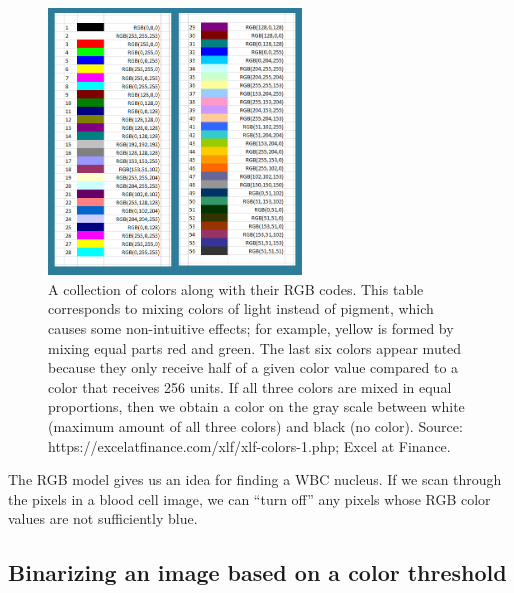 \begin{figure}[h]
\centering
\mySfFamily
\includegraphics[width = 0.6\textwidth]{../images/RGB_color_chart.png}
\caption{A collection of colors along with their RGB codes. This table corresponds to mixing colors of light instead of pigment, which causes some non-intuitive effects; for example, yellow is formed by mixing equal parts red and green. The last six colors appear muted because they only receive half of a given color value compared to a color that receives 256 units. If all three colors are mixed in equal proportions, then we obtain a color on the gray scale between white (maximum amount of all three colors) and black (no color). Source: https://excelatfinance.com/xlf/xlf-colors-1.php; Excel at Finance.}
\label{fig:RGB_color_chart}
\end{figure}

The RGB model gives us an idea for finding a WBC nucleus. If we scan through the pixels in a blood cell image, we can “turn off” any pixels whose RGB color values are not sufficiently blue.\\

\begin{qbox}\end{qbox}

\FloatBarrier
{}
\subsection{Binarizing an image based on a color threshold}

